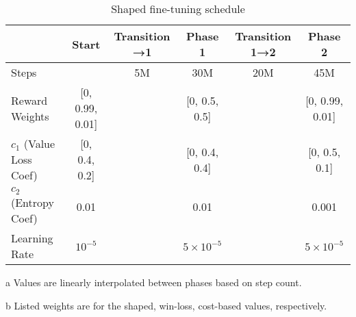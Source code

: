 \documentclass[conference,onecolumn]{IEEEtran}
\newcounter{supptable}
\newenvironment{supptable}
  {\renewcommand{\tablename}{Supplemental Table}\setcounter{table}{\value{supptable}}\addtocounter{supptable}{1}\begin{table}}
  {\end{table}\setcounter{supptable}{\value{table}}}
\begin{document}
\begin{supptable}[H]
\end{supptable}

\begin{supptable}[H]
    \centering
    \begin{threeparttable}
    \caption{Shaped fine-tuning schedule}
    \label{tab:shaped-finetuning-schedule}
    \begin{tabular}{lccccc}
    \toprule
     & Start & Transition →1\tnote{a} & Phase 1 & Transition 1→2\tnote{a} & Phase 2 \\
     \midrule
    Steps & & 5M & 30M & 20M & 45M \\
    Reward Weights\tnote{b} & [0, 0.99, 0.01] & & [0, 0.5, 0.5] & & [0, 0.99, 0.01] \\
    $c_1$ (Value Loss Coef)\tnote{b} & [0, 0.4, 0.2] & & [0, 0.4, 0.4] & & [0, 0.5, 0.1]\\
    $c_2$ (Entropy Coef) & 0.01 & & 0.01 & & 0.001 \\
    Learning Rate & $10^{-5}$ & & $5 \times 10^{-5}$ & & $5 \times 10^{-5}$\\
    \bottomrule
    \end{tabular}
    \begin{tablenotes}
       \item[a] Values are linearly interpolated between phases based on step count.
       \item[b] Listed weights are for the shaped, win-loss, cost-based values, respectively.
    \end{tablenotes}
    \end{threeparttable}
\end{supptable}
\end{document}
